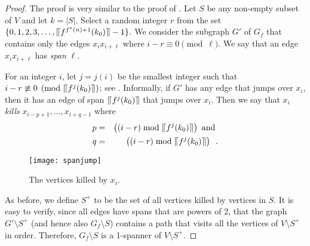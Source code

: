 \documentclass[final]{siamltex}
\newcommand{\upen}[1]{\llceil#1\rrceil}
\begin{document}
\begin{proof}
  The proof is very similar to the proof of .  Let $S$ be
  any non-empty subset of $V$ and let $k=|S|$.   Select a random integer
  $r$ from the set $\{0,1,2,3,\ldots,\upen{f^{f^*(n)+1}(k_0)}-1\}$.  We consider the
  subgraph $G'$ of $G_f$ that contains only the edges $x_ix_{i+\ell}$
  where $i-r\equiv 0\pmod{\ell}$.  We say that an edge $x_ix_{i+\ell}$
  has \emph{span} $\ell$.

  For an integer $i$, let $j=j(i)$ be the smallest integer such that
  $i-r\not\equiv 0\pmod{\upen{f^j(k_0)}}$; see .
  Informally, if $G'$ has any edge that jumps over $x_i$, then it has an
  edge of span $\upen{f^j(k_0)}$ that jumps over $x_i$.  Then we say that
   $x_i$ \emph{kills} $x_{i-p+1},\ldots,x_{i+q-1}$ where
  \begin{eqnarray*}
     p&=& \left((i-r) \bmod \upen{f^j(k_0)}\right) \text{ and } \\
     q&=& \left((i-r) \bmod \upen{f^j(k_0)}\right) \enspace .
  \end{eqnarray*}
  \begin{figure}
    \begin{center}
      \texttt{[image: spanjump]}
    \end{center}
    \caption{The vertices killed by $x_i$.}
  \end{figure}
  As before, we define $S^+$ to be the set of all vertices killed by
  vertices in $S$.  It is easy to verify, since all edges have
  spans that are powers of 2, that the graph $G'\setminus S^+$ (and hence
  also $G_f\setminus S$) contains a path that visits all the vertices of
  $V\setminus S^+$ in order.  Therefore, $G_f\setminus S$ is a 1-spanner
  of $V\setminus S^+$.


\end{proof}
\end{document}
